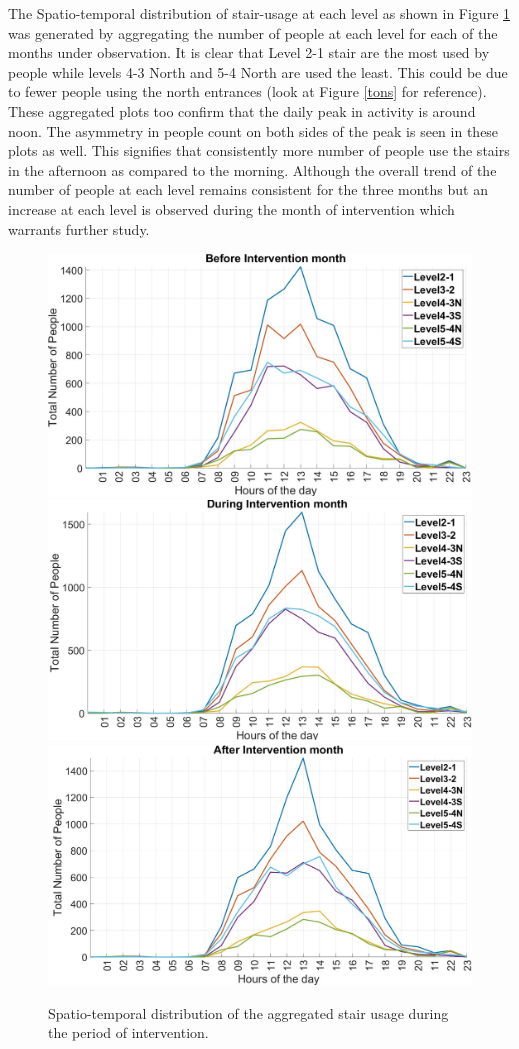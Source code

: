 \documentclass[../UNBThesis2.tex]{subfiles}
\begin{document}
The Spatio-temporal distribution of stair-usage at each level as shown in Figure \ref{spa1} was generated by aggregating the number of people at each level for each of the months under observation. It is clear that Level 2-1 stair are the most used by people while levels 4-3 North and 5-4 North are used the least. This could be due to fewer people using the north entrances (look at Figure \ref{tons} for reference). These aggregated plots too confirm that the daily peak in activity is around noon. The asymmetry in people count on both sides of the peak is seen in these plots as well. This signifies that consistently more number of people use the stairs in the afternoon as compared to the morning. Although the overall trend of the number of people at each level remains consistent for the three months but an increase at each level is observed during the month of intervention which warrants further study.

\begin{figure}[tpb]
    \includegraphics[width=.5\textwidth]{image/before_int.jpg}\hfill
    \includegraphics[width=.5\textwidth]{image/during_int.jpg}\hfill\centering
    \includegraphics[width=.5\textwidth]{image/after_int.jpg}
    \\[\smallskipamount]
    \caption{Spatio-temporal distribution of the aggregated stair usage during the period of intervention.}
    \label{spa1}
\end{figure}
\end{document}
